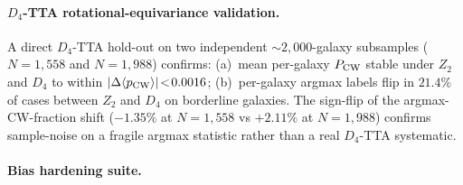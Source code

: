 \documentclass[aps,prd,twocolumn,superscriptaddress,preprintnumbers,nofootinbib,longbibliography,floatfix]{revtex4-2}
\newcommand{\pcw}{P_{\rm CW}}
\begin{document}
\paragraph{$D_4$-TTA rotational-equivariance validation.}
A direct $D_4$-TTA hold-out on two independent $\sim\!2{,}000$-galaxy subsamples ($N\!=\!1{,}558$ and $N\!=\!1{,}988$) confirms: (a)~mean per-galaxy $\pcw$ stable under $Z_2$ and $D_4$ to within $|\Delta\langle p_{\rm CW}\rangle|\!<\!0.0016$; (b)~per-galaxy argmax labels flip in $21.4\%$ of cases between $Z_2$ and $D_4$ on borderline galaxies. The sign-flip of the argmax-CW-fraction shift ($-1.35\%$ at $N\!=\!1{,}558$ vs $+2.11\%$ at $N\!=\!1{,}988$) confirms sample-noise on a fragile argmax statistic rather than a real $D_4$-TTA systematic.

\paragraph{Bias hardening suite.}
\end{document}
